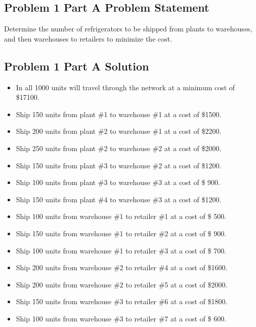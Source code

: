 \documentclass[../report/main.tex]{subfiles}
\begin{document}
\subsection*{Problem 1 Part A Problem Statement}
Determine the number of refrigerators to be shipped from plants to warehouses, and then warehouses to retailers to minimize the cost.

\subsection*{Problem 1 Part A Solution}
\begin{itemize}
	\item In all 1000 units will travel through the network at a minimum cost of \$17100.
	\newline
	\item Ship 150 units from plant \#1 to warehouse \#1 at a cost of \$1500.
	\item Ship 200 units from plant \#2 to warehouse \#1 at a cost of \$2200.
	\item Ship 250 units from plant \#2 to warehouse \#2 at a cost of \$2000.
	\item Ship 150 units from plant \#3 to warehouse \#2 at a cost of \$1200.
	\item Ship 100 units from plant \#3 to warehouse \#3 at a cost of \$ 900.
	\item Ship 150 units from plant \#4 to warehouse \#3 at a cost of \$1200.
	\newline
	\item Ship 100 units from warehouse \#1 to retailer \#1 at a cost of \$ 500.
	\item Ship 150 units from warehouse \#1 to retailer \#2 at a cost of \$ 900.
	\item Ship 100 units from warehouse \#1 to retailer \#3 at a cost of \$ 700.
	\item Ship 200 units from warehouse \#2 to retailer \#4 at a cost of \$1600.
	\item Ship 200 units from warehouse \#2 to retailer \#5 at a cost of \$2000.
	\item Ship 150 units from warehouse \#3 to retailer \#6 at a cost of \$1800.
	\item Ship 100 units from warehouse \#3 to retailer \#7 at a cost of \$ 600.

\end{itemize}
\end{document}
